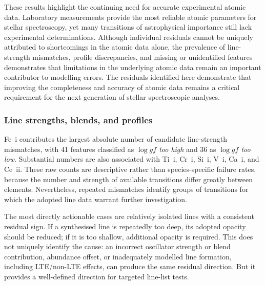 \documentclass[twocolumn,apj,numberedappendix,appendixfloats]{openjournal}
\begin{document}
These results highlight the continuing need for accurate experimental atomic data. Laboratory measurements provide the most reliable atomic parameters for stellar spectroscopy, yet many transitions of astrophysical importance still lack experimental determinations. Although individual residuals cannot be uniquely attributed to shortcomings in the atomic data alone, the prevalence of line-strength mismatches, profile discrepancies, and missing or unidentified features demonstrates that limitations in the underlying atomic data remain an important contributor to modelling errors. The residuals identified here demonstrate that improving the completeness and accuracy of atomic data remains a critical requirement for the next generation of stellar spectroscopic analyses.

\subsubsection{Line strengths, blends, and profiles}

Fe~{\sc i} contributes the largest absolute number of candidate line-strength mismatches, with 41 features classified as \textit{$\log gf$ too high} and 36 as \textit{$\log gf$ too low}. Substantial numbers are also associated with Ti~{\sc i}, Cr~{\sc i}, Si~{\sc i}, V~{\sc i}, Ca~{\sc i}, and Ce~{\sc ii}. These raw counts are descriptive rather than species-specific failure rates, because the number and strength of available transitions differ greatly between elements. Nevertheless, repeated mismatches identify groups of transitions for which the adopted line data warrant further investigation.

The most directly actionable cases are relatively isolated lines with a consistent residual sign. If a synthesised line is repeatedly too deep, its adopted opacity should be reduced; if it is too shallow, additional opacity is required. This does not uniquely identify the cause: an incorrect oscillator strength or blend contribution, abundance offset, or inadequately modelled line formation, including LTE/non-LTE effects, can produce the same residual direction. But it provides a well-defined direction for targeted line-list tests.
\end{document}
